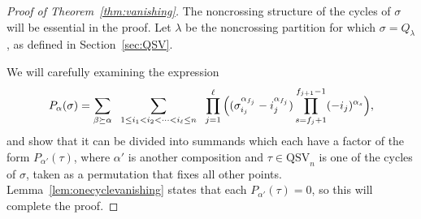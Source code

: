 \documentclass[12pt]{amsart}
\theoremstyle{definition}
\theoremstyle{remark}
\numberwithin{equation}{section}
\newcommand{\QSV}{\mathrm{QSV}}
\begin{document}
\begin{proof}[Proof of Theorem~\ref{thm:vanishing}]
The noncrossing structure of the cycles of $\sigma$ will be essential in the proof.  
Let $\lambda$ be the noncrossing partition for which $\sigma = Q_{\lambda}$, as defined in Section~\ref{sec:QSV}.  

We will carefully examining the expression
\begin{equation}\label{eq:Palpha_evaluated}
P_{\alpha}(\sigma) =  
\sum_{\beta \succeq \alpha}
\hspace{0.6em}
\sum_{1\le i_{1} < i_{2} < \cdots < i_{\ell} \le n} 
\hspace{0.6em}
\prod_{j = 1}^{\ell}
\Big(
(\sigma_{i_{j}}^{\alpha_{f_{j}}} - i_{j}^{\alpha_{f_{j}}}) 
\prod_{s = f_{j} + 1}^{f_{j+1} - 1} (- i_{j})^{\alpha_{s}}
\Big),
\end{equation}
and show that it can be divided into summands which each have a factor of the form $P_{\alpha'}(\tau)$, where $\alpha'$ is another composition and $\tau \in \QSV_{n}$ is one of the cycles of $\sigma$, taken as a permutation that fixes all other points.  Lemma~\ref{lem:onecyclevanishing} states that each $P_{\alpha'}(\tau) = 0$, so this will complete the proof.



\end{proof}
\end{document}

